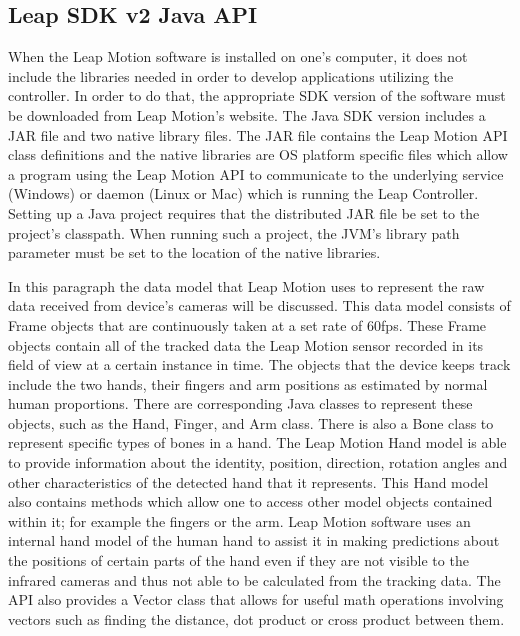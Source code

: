 	
\subsection{Leap SDK v2 Java API}
When the Leap Motion software is installed on one's computer, it does not include the libraries needed in order to develop applications utilizing the controller. In order to do that, the appropriate SDK version of the software must be downloaded from Leap Motion's website. The Java SDK version includes a JAR file and two native library files. The JAR file contains the Leap Motion API class definitions and the native libraries are OS platform specific files which allow a program using the Leap Motion API to communicate to the underlying service (Windows) or daemon (Linux or Mac) which is running the Leap Controller. Setting up a Java project requires that the distributed JAR file be set to the project's classpath. When running such a project, the JVM's library path parameter must be set to the location of the native libraries.


In this paragraph the data model that Leap Motion uses to represent the raw data received from device's cameras will be discussed. This data model consists of Frame objects that are continuously taken at a set rate of 60fps. These Frame objects contain all of the tracked data the Leap Motion sensor recorded in its field of view at a certain instance in time. The objects that the device keeps track include the two hands, their fingers and arm positions as estimated by normal human proportions. There are corresponding Java classes to represent these objects, such as the Hand, Finger, and Arm class. There is also a Bone class to represent specific types of bones in a hand. The Leap Motion Hand model is able to provide information about the identity, position, direction, rotation angles and other characteristics of the detected hand that it represents. This Hand model also contains methods which allow one to access other model objects contained within it; for example the fingers or the arm. Leap Motion software uses an internal hand model of the human hand to assist it in making predictions about the positions of certain parts of the hand even if they are not visible to the infrared cameras and thus not able to be calculated from the tracking data. The API also provides a Vector class that allows for useful math operations involving vectors such as finding the distance, dot product or cross product between them. 

